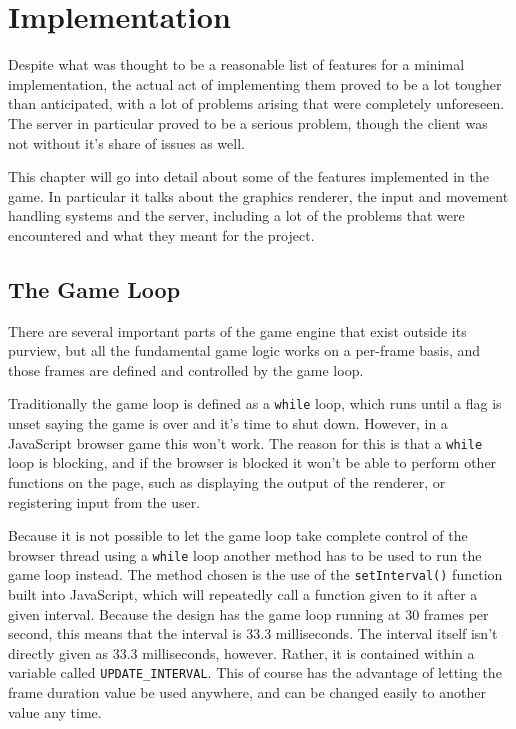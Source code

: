 \chapter{Implementation}

Despite what was thought to be a reasonable list of features for a minimal implementation, the actual act of implementing them proved to be a lot tougher than anticipated, with a lot of problems arising that were completely unforeseen. The server in particular proved to be a serious problem, though the client was not without it's share of issues as well.

This chapter will go into detail about some of the features implemented in the game. In particular it talks about the graphics renderer, the input and movement handling systems and the server, including a lot of the problems that were encountered and what they meant for the project.

\section{The Game Loop}\label{game_loop_implementation}
There are several important parts of the game engine that exist outside its purview, but all the fundamental game logic works on a per-frame basis, and those frames are defined and controlled by the game loop.

Traditionally the game loop is defined as a \texttt{while} loop, which runs until a flag is unset saying the game is over and it's time to shut down. However, in a JavaScript browser game this won't work. The reason for this is that a \texttt{while} loop is blocking, and if the browser is blocked it won't be able to perform other functions on the page, such as displaying the output of the renderer, or registering input from the user.

Because it is not possible to let the game loop take complete control of the browser thread using a \texttt{while} loop another method has to be used to run the game loop instead. The method chosen is the use of the \texttt{setInterval()} function built into JavaScript, which will repeatedly call a function given to it after a given interval. Because the design has the game loop running at 30 frames per second, this means that the interval is 33.3 milliseconds. The interval itself isn't directly given as 33.3 milliseconds, however. Rather, it is contained within a variable called \texttt{UPDATE\_INTERVAL}. This of course has the advantage of letting the frame duration value be used anywhere, and can be changed easily to another value any time.

